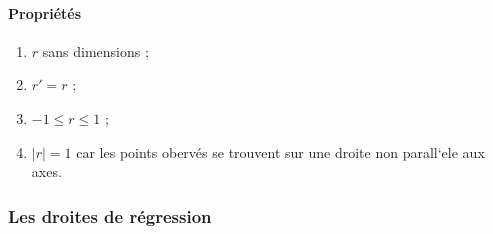 \paragraph{Propriétés}
\begin{enumerate}
	\item $r$ sans dimensions ;
	\item $r' = r$ ;
	\item $-1 \leq r \leq 1$ ;
	\item $|r| = 1$ car les points obervés se trouvent sur une droite non parall`ele aux axes.
\end{enumerate}








\newpage
\subsubsection{Les droites de régression}

